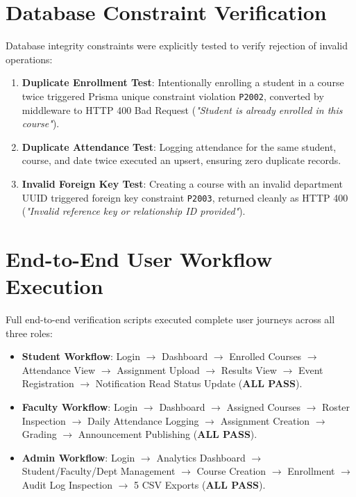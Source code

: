 \section{Database Constraint Verification}
Database integrity constraints were explicitly tested to verify rejection of invalid operations:
\begin{enumerate}
    \item \textbf{Duplicate Enrollment Test}: Intentionally enrolling a student in a course twice triggered Prisma unique constraint violation \texttt{P2002}, converted by middleware to HTTP 400 Bad Request (\textit{"Student is already enrolled in this course"}).
    \item \textbf{Duplicate Attendance Test}: Logging attendance for the same student, course, and date twice executed an upsert, ensuring zero duplicate records.
    \item \textbf{Invalid Foreign Key Test}: Creating a course with an invalid department UUID triggered foreign key constraint \texttt{P2003}, returned cleanly as HTTP 400 (\textit{"Invalid reference key or relationship ID provided"}).
\end{enumerate}

\section{End-to-End User Workflow Execution}
Full end-to-end verification scripts executed complete user journeys across all three roles:
\begin{itemize}
    \item \textbf{Student Workflow}: Login $\rightarrow$ Dashboard $\rightarrow$ Enrolled Courses $\rightarrow$ Attendance View $\rightarrow$ Assignment Upload $\rightarrow$ Results View $\rightarrow$ Event Registration $\rightarrow$ Notification Read Status Update (\textbf{ALL PASS}).
    \item \textbf{Faculty Workflow}: Login $\rightarrow$ Dashboard $\rightarrow$ Assigned Courses $\rightarrow$ Roster Inspection $\rightarrow$ Daily Attendance Logging $\rightarrow$ Assignment Creation $\rightarrow$ Grading $\rightarrow$ Announcement Publishing (\textbf{ALL PASS}).
    \item \textbf{Admin Workflow}: Login $\rightarrow$ Analytics Dashboard $\rightarrow$ Student/Faculty/Dept Management $\rightarrow$ Course Creation $\rightarrow$ Enrollment $\rightarrow$ Audit Log Inspection $\rightarrow$ 5 CSV Exports (\textbf{ALL PASS}).
\end{itemize}
